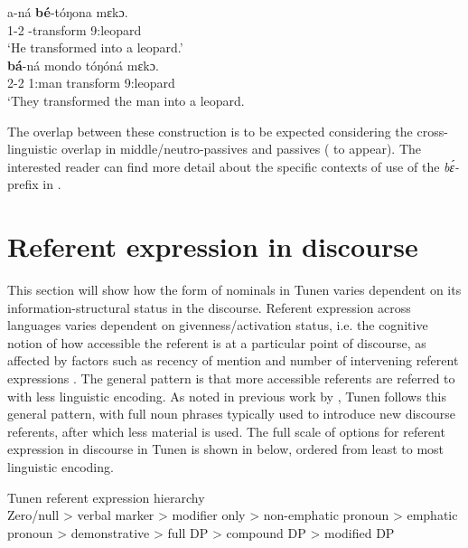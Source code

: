 \documentclass[output=paper,colorlinks,citecolor=brown
]{langscibook}
\begin{document}
\ea \label{passivemid} 
\ea
\gll
a-ná \textbf{bé}-tóŋona mɛkɔ.\\
{\db}1\SM{}-\PST{}2{} \MID{}-transform 9:leopard \\
\glt
`He transformed into a leopard.' \\

\ex
\gll
\textbf{bá}-ná mondo tóŋóná mɛkɔ.\\
{\db}2\SM{}-\PST{}2{} 1:man transform 9:leopard \\
\glt
‘They transformed the man into a leopard. 

\z
\z

The overlap between these construction is to be expected considering the cross-linguistic overlap in middle/neutro-passives and passives (\citeauthor{GuéroisFut} to appear). The interested reader can find more detail about the specific contexts of use of the \textit{bɛ́-} prefix in \citet{Mous2008}.

\section{Referent expression in discourse}\label{secreference}
This section will show how the form of nominals in Tunen varies dependent on its information-structural status in the discourse. Referent expression across languages varies dependent on givenness/activation status, i.e. the cognitive notion of how accessible the referent is at a particular point of discourse, as affected by factors such as recency of mention and number of intervening referent expressions \citep{GundelEtAl1993, Ariel2001}. The general pattern is that more accessible referents are referred to with less linguistic encoding. As noted in previous work by \citet{Isaac2007}, Tunen follows this general pattern, with full noun phrases typically used to introduce new discourse referents, after which less material is used. The full scale of options for referent expression in discourse in Tunen is shown in  below, ordered from least to most linguistic encoding.

\ea \label{refhierarchy} Tunen referent expression hierarchy \\
Zero/null > verbal marker > modifier only > non-emphatic pronoun > emphatic pronoun > demonstrative > full DP > compound DP > modified DP
\z
\end{document}
